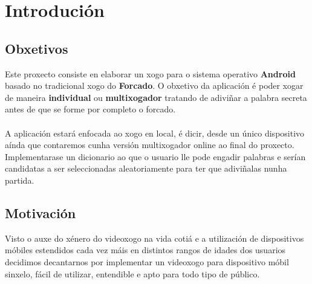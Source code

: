 \chapter{Introdución}
\label{chap:introducion}
\section{Obxetivos}
Este proxecto consiste en elaborar un xogo para o sistema operativo \textbf{Android} \cite{android-dev} \cite{night-mode} \cite{landscape} \cite{start-activity} basado no tradicional xogo do \textbf{Forcado}. O obxetivo da aplicación é poder xogar de maneira \textbf{individual} ou \textbf{multixogador} tratando de adiviñar a palabra secreta antes de que se forme por completo o forcado.\\
\\
A aplicación estará enfocada ao xogo en local, é dicir, desde un único dispositivo aínda que contaremos cunha versión multixogador online ao final do proxecto. Implementarase un dicionario ao que o usuario lle pode engadir palabras e serían candidatas a ser seleccionadas aleatoriamente para ter que adiviñalas nunha partida.

\section{Motivación}
Visto o auxe do xénero do videoxogo na vida cotiá e a utilización de dispositivos móbiles estendidos cada vez máis en distintos rangos de idades dos usuarios decidimos decantarnos por implementar un videoxogo para dispositivo móbil sinxelo, fácil de utilizar, entendible e apto para todo tipo de público.


